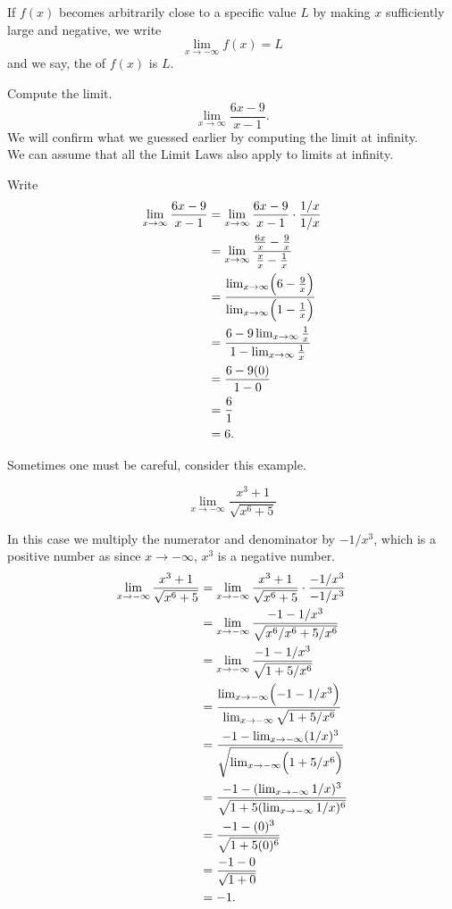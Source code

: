 \documentclass{ximera}
\begin{document}
\begin{example}
\begin{definition}
If $f(x)$ becomes arbitrarily close to a specific value $L$ by making
$x$ sufficiently large and negative, we write
\[
\lim_{x\to -\infty} f(x) = L
\]
and we say, the  of $f(x)$ is $L$.  
\end{definition}

\begin{example}  Compute the limit.
\[
\lim_{x\to\infty} \frac{6x-9}{x-1}.
\]
We will confirm what we guessed earlier by computing the limit at infinity.\\
 We can assume that all the Limit Laws also apply to limits at infinity.
\begin{explanation}
Write
\begin{align*}
\lim_{x\to\infty}\frac{6x-9}{x-1} &= \lim_{x\to\infty}\frac{6x-9}{x-1}\cdot \frac{1/x}{1/x}\\
&=\lim_{x\to\infty}\frac{\frac{6x}{x} - \frac{9}{x}}{\frac{x}{x} - \frac{1}{x}}\\
&=\frac{\lim_{x\to\infty}\Bigl(6- \frac{9}{x}\Bigr)}{\lim_{x\to\infty}\Bigl(1- \frac{1}{x}\Bigr)}\\
&=\frac{6-9\lim_{x\to\infty}  \frac{1}{x}}{1-\lim_{x\to\infty} \frac{1}{x}}\\
&=\frac{6-9(0)}{1-0}\\
&=  \frac{6}{1}\\
&= 6.
\end{align*}
\end{explanation}
\end{example}

Sometimes one must be careful, consider this example.

\begin{example}

\[
\lim_{x\to -\infty} \frac{x^3+1}{\sqrt{x^6+5}}
\]
\begin{explanation}
In this case we multiply the numerator and denominator by $-1/x^3$,
which is a positive number as since $x\to -\infty$, $x^3$ is a negative
number.
\begin{align*}
\lim_{x\to -\infty} \frac{x^3+1}{\sqrt{x^6+5}} &= \lim_{x\to -\infty} \frac{x^3+1}{\sqrt{x^6+5}} \cdot \frac{-1/x^3}{-1/x^3}\\
&= \lim_{x\to -\infty} \frac{-1-1/x^3}{\sqrt{x^6/x^6+5/x^6}}\\
&= \lim_{x\to -\infty} \frac{-1-1/x^3}{\sqrt{1+5/x^6}}\\
&= \frac{ \lim_{x\to -\infty}\Bigl(-1-1/x^3\Bigr)}{\lim_{x\to -\infty}\sqrt{1+5/x^6}}\\
&= \frac{ -1-\lim_{x\to -\infty}(1/x)^3}{\sqrt{\lim_{x\to -\infty}\Bigl(1+5/x^6\Bigr)}}\\
&= \frac{ -1-(\lim_{x\to -\infty}1/x)^3}{\sqrt{1+5(\lim_{x\to -\infty}1/x)^6}}\\
&= \frac{ -1-(0)^3}{\sqrt{1+5(0)^6}}\\
&= \frac{ -1-0}{\sqrt{1+0}}\\
&= -1.
\end{align*}
\end{explanation}
\end{example}


\end{example}
\end{document}
